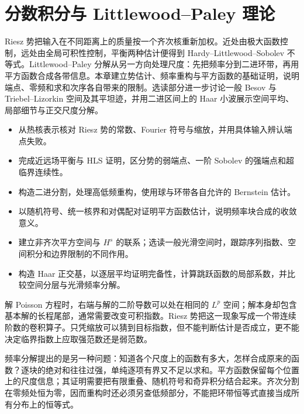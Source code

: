 \chapter{分数积分与 Littlewood–Paley 理论}
\label{b2:ch:19}
\begin{chapterabstract}
Riesz 势把输入在不同距离上的质量按一个齐次核重新加权。近处由极大函数控制，远处由全局可积性控制，平衡两种估计便得到 Hardy--Littlewood--Sobolev 不等式。Littlewood--Paley 分解从另一方向处理尺度：先把频率分到二进环带，再用平方函数合成各带信息。本章建立势估计、频率重构与平方函数的基础证明，说明端点、零频和求和次序各自带来的限制。选读部分进一步讨论一般 Besov 与 Triebel--Lizorkin 空间及其平坦迹，并用二进区间上的 Haar 小波展示空间平均、局部细节与正交尺度分解。
\end{chapterabstract}

\begin{learninggoals}\begin{itemize}
\item\label{b2:item:19-goal-1}从热核表示核对 Riesz 势的常数、Fourier 符号与缩放，并用具体输入辨认端点失败。
\item\label{b2:item:19-goal-2}完成近远场平衡与 HLS 证明，区分势的弱端点、一阶 Sobolev 的强端点和超临界连续性。
\item\label{b2:item:19-goal-3}构造二进分割，处理高低频重构，使用球与环带各自允许的 Bernstein 估计。
\item\label{b2:item:19-goal-4}以随机符号、统一核界和对偶配对证明平方函数估计，说明频率块合成的收敛意义。
\item\label{b2:item:19-goal-5}建立非齐次平方空间与 \(H^s\) 的联系；选读一般光滑空间时，跟踪序列指数、空间积分和边界限制的不同作用。
\item\label{b2:item:19-goal-haar}构造 Haar 正交基，以逐层平均证明完备性，计算跳跃函数的局部系数，并比较空间分层与光滑频率分解。
\end{itemize}\end{learninggoals}

解 Poisson 方程时，右端与解的二阶导数可以处在相同的 \(L^p\) 空间；解本身却包含基本解的长程尾部，通常需要改变可积指数。Riesz 势把这一现象写成一个带连续阶数的卷积算子。只凭缩放可以猜到目标指数，但不能判断估计是否成立，更不能决定临界指数上应取强范数还是弱范数。

\ProseParagraphBreak

频率分解提出的是另一种问题：知道各个尺度上的函数有多大，怎样合成原来的函数？逐块的绝对和往往过强，单纯逐项有界又不足以求和。平方函数保留每个位置上的尺度信息；其证明需要把有限重叠、随机符号和奇异积分结合起来。齐次分割在零频处恒为零，因而重构时还必须另查低频部分，不能把环带恒等式直接当成所有分布上的恒等式。

